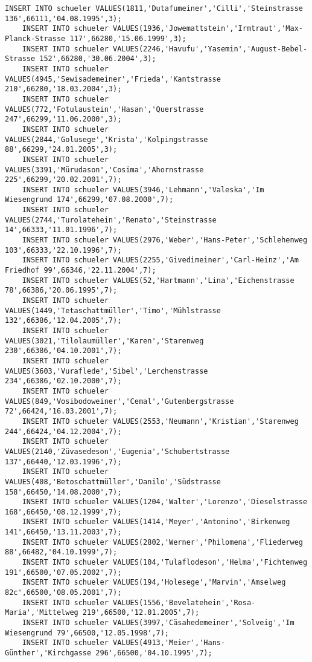 \begin{lstlisting}[breaklines=True, numbers=none, basicstyle=\tiny, keepspaces=false]
	INSERT INTO schueler VALUES(1811,'Dutafumeiner','Cilli','Steinstrasse 136',66111,'04.08.1995',3);
	INSERT INTO schueler VALUES(1936,'Jowemattstein','Irmtraut','Max-Planck-Strasse 117',66280,'15.06.1999',3);
	INSERT INTO schueler VALUES(2246,'Havufu','Yasemin','August-Bebel-Strasse 152',66280,'30.06.2004',3);
	INSERT INTO schueler VALUES(4945,'Sewisademeiner','Frieda','Kantstrasse 210',66280,'18.03.2004',3);
	INSERT INTO schueler VALUES(772,'Fotulaustein','Hasan','Querstrasse 247',66299,'11.06.2000',3);
	INSERT INTO schueler VALUES(2844,'Golusege','Krista','Kolpingstrasse 88',66299,'24.01.2005',3);
	INSERT INTO schueler VALUES(3391,'Mürudason','Cosima','Ahornstrasse 225',66299,'20.02.2001',7);
	INSERT INTO schueler VALUES(3946,'Lehmann','Valeska','Im Wiesengrund 174',66299,'07.08.2000',7);
	INSERT INTO schueler VALUES(2744,'Turolatehein','Renato','Steinstrasse 14',66333,'11.01.1996',7);
	INSERT INTO schueler VALUES(2976,'Weber','Hans-Peter','Schlehenweg 103',66333,'22.10.1996',7);
	INSERT INTO schueler VALUES(2255,'Givedimeiner','Carl-Heinz','Am Friedhof 99',66346,'22.11.2004',7);
	INSERT INTO schueler VALUES(52,'Hartmann','Lina','Eichenstrasse 78',66386,'20.06.1995',7);
	INSERT INTO schueler VALUES(1449,'Tetaschattmüller','Timo','Mühlstrasse 132',66386,'12.04.2005',7);
	INSERT INTO schueler VALUES(3021,'Tilolaumüller','Karen','Starenweg 230',66386,'04.10.2001',7);
	INSERT INTO schueler VALUES(3603,'Vuraflede','Sibel','Lerchenstrasse 234',66386,'02.10.2000',7);
	INSERT INTO schueler VALUES(849,'Vosibodoweiner','Cemal','Gutenbergstrasse 72',66424,'16.03.2001',7);
	INSERT INTO schueler VALUES(2553,'Neumann','Kristian','Starenweg 244',66424,'04.12.2004',7);
	INSERT INTO schueler VALUES(2140,'Züvasedeson','Eugenia','Schubertstrasse 137',66440,'12.03.1996',7);
	INSERT INTO schueler VALUES(408,'Betoschattmüller','Danilo','Südstrasse 158',66450,'14.08.2000',7);
	INSERT INTO schueler VALUES(1204,'Walter','Lorenzo','Dieselstrasse 168',66450,'08.12.1999',7);
	INSERT INTO schueler VALUES(1414,'Meyer','Antonino','Birkenweg 141',66450,'13.11.2003',7);
	INSERT INTO schueler VALUES(2802,'Werner','Philomena','Fliederweg 88',66482,'04.10.1999',7);
	INSERT INTO schueler VALUES(104,'Tulaflodeson','Helma','Fichtenweg 191',66500,'07.05.2002',7);
	INSERT INTO schueler VALUES(194,'Holesege','Marvin','Amselweg 82c',66500,'08.05.2001',7);
	INSERT INTO schueler VALUES(1556,'Bevelatehein','Rosa-Maria','Mittelweg 219',66500,'12.01.2005',7);
	INSERT INTO schueler VALUES(3997,'Cäsahedemeiner','Solveig','Im Wiesengrund 79',66500,'12.05.1998',7);
	INSERT INTO schueler VALUES(4913,'Meier','Hans-Günther','Kirchgasse 296',66500,'04.10.1995',7);

\end{lstlisting}
